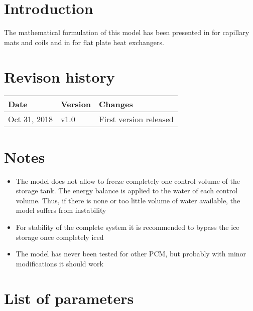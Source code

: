\documentclass[english]{SPFReport}
\author{Dr. Daniel Carbonell}
\begin{document}
 


\section{Introduction}

The mathematical formulation of this model has been presented in \citet{carbonell_experimental_2018} for capillary mats and coils and in \citet{ICEEX_2017} for flat plate heat exchangers.

\section{Revison history}

  \begin{tabular}{|p{40mm}|p{15mm}|p{101mm}|}\hline    
    \textbf{Date} & \textbf{Version} & \textbf{Changes}  \\\hline
     Oct 31, 2018 & v1.0 & First version released \\\hline
  \end{tabular}

\section{Notes}

\begin{itemize}
\item The model does not allow to freeze completely one control volume of the storage tank. The energy balance is applied to the water of each control volume. Thus, if there is none or too little volume of water available, the model suffers from instability
\item For stability of the complete system it is recommended to bypass the ice storage once completely iced
\item The model has never been tested for other PCM, but probably with minor modifications it should work
\end{itemize}

\section{List of parameters}
\end{document}
